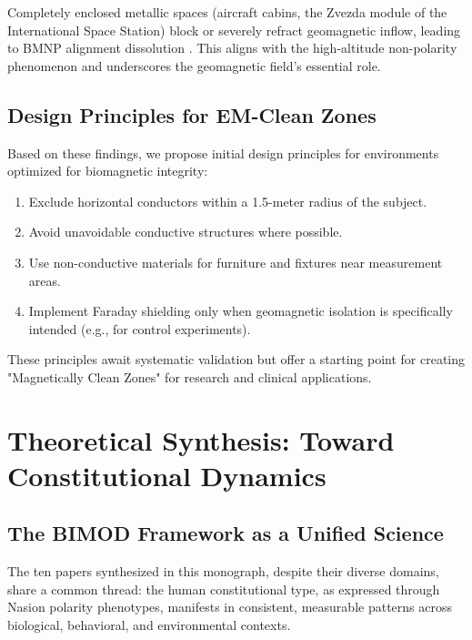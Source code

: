 \documentclass[12pt,a4paper]{article}
\begin{document}
Completely enclosed metallic spaces (aircraft cabins, the Zvezda module of the International Space Station) block or severely refract geomagnetic inflow, leading to BMNP alignment dissolution \cite{yoon2026_400}. This aligns with the high-altitude non-polarity phenomenon and underscores the geomagnetic field's essential role.

\subsection{Design Principles for EM-Clean Zones}

Based on these findings, we propose initial design principles for environments optimized for biomagnetic integrity:

\begin{enumerate}
    \item Exclude horizontal conductors within a 1.5-meter radius of the subject.
    \item Avoid unavoidable conductive structures where possible.
    \item Use non-conductive materials for furniture and fixtures near measurement areas.
    \item Implement Faraday shielding only when geomagnetic isolation is specifically intended (e.g., for control experiments).
\end{enumerate}

These principles await systematic validation but offer a starting point for creating "Magnetically Clean Zones" for research and clinical applications.


\section{Theoretical Synthesis: Toward Constitutional Dynamics}

\subsection{The BIMOD Framework as a Unified Science}

The ten papers synthesized in this monograph, despite their diverse domains, share a common thread: the human constitutional type, as expressed through Nasion polarity phenotypes, manifests in consistent, measurable patterns across biological, behavioral, and environmental contexts.
\end{document}
